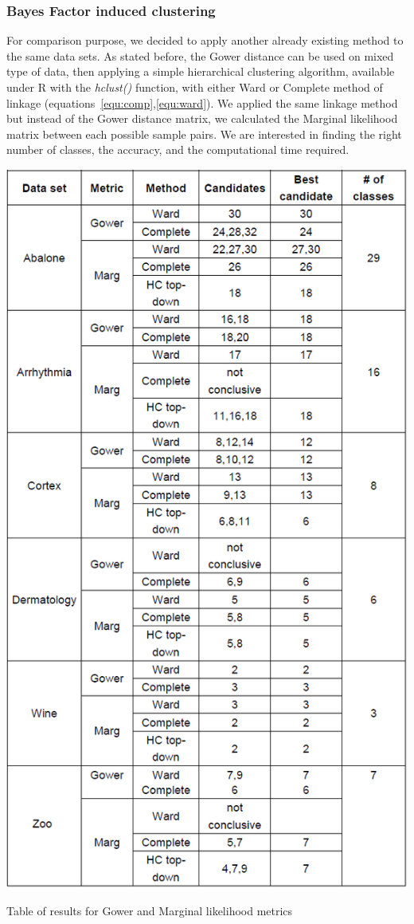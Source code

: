 \documentclass[twocolumn,12pt]{article}
\begin{document}
\subsubsection{Bayes Factor induced clustering}

For comparison purpose, we decided to apply another already existing method to the same data sets. As stated before, the Gower distance can be used on mixed type of data, then applying a simple hierarchical clustering algorithm, available under R with the \emph{hclust()} function, with either Ward or Complete method of linkage (equations~\ref{equ:comp},\ref{equ:ward}).
We applied the same linkage method but instead of the Gower distance matrix, we calculated the Marginal likelihood matrix between each possible sample pairs.
We are interested in finding the right number of classes, the accuracy, and the computational time required.
\begin{table}[!]
    \centering
    \includegraphics[scale=0.35]{img/ResultsTable.png}
    \caption{Table of results for Gower and Marginal likelihood metrics}
    \label{tab:ResTab}
\end{table}
\end{document}
